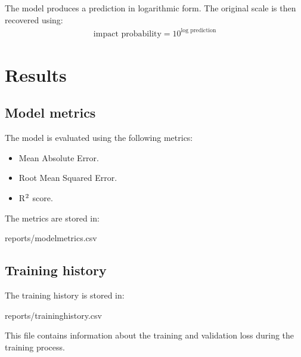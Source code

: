 \documentclass[letterpaper,10pt,english]{sphinxmanual}
\begin{document}
\sphinxAtStartPar
The model produces a prediction in logarithmic form. The original scale is
then recovered using:
\begin{equation*}
\begin{split}\text{impact probability} = 10^{\text{log prediction}}\end{split}
\end{equation*}
\sphinxstepscope


\section{Results}
\label{\detokenize{results:results}}\label{\detokenize{results::doc}}

\subsection{Model metrics}
\label{\detokenize{results:model-metrics}}
\sphinxAtStartPar
The model is evaluated using the following metrics:
\begin{itemize}
\item {} 
\sphinxAtStartPar
Mean Absolute Error.

\item {} 
\sphinxAtStartPar
Root Mean Squared Error.

\item {} 
\sphinxAtStartPar
R\(\sp{\text{2}}\) score.

\end{itemize}

\sphinxAtStartPar
The metrics are stored in:

\begin{sphinxVerbatim}[commandchars=\\\{\}]
reports/model\PYGZus{}metrics.csv
\end{sphinxVerbatim}


\subsection{Training history}
\label{\detokenize{results:training-history}}
\sphinxAtStartPar
The training history is stored in:

\begin{sphinxVerbatim}[commandchars=\\\{\}]
reports/training\PYGZus{}history.csv
\end{sphinxVerbatim}

\sphinxAtStartPar
This file contains information about the training and validation loss during
the training process.
\end{document}
